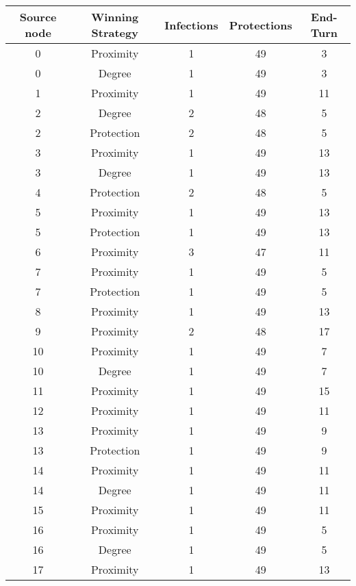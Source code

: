 \documentclass[results.tex]{subfiles}
\begin{document}
\begin{center}
  \begin{tabular}{| c || c | c | c | c |}
    \hline
    {\bfseries Source node} & {\bfseries Winning Strategy} & {\bfseries Infections} & {\bfseries Protections} & {\bfseries End-Turn} \\  %
    \hline\hline
    0 & Proximity & 1 & 49 & 3 \\ 
    \hline
    0 & Degree & 1 & 49 & 3 \\ 
    \hline
    1 & Proximity & 1 & 49 & 11 \\ 
    \hline
    2 & Degree & 2 & 48 & 5 \\ 
    \hline
    2 & Protection & 2 & 48 & 5 \\ 
    \hline
    3 & Proximity & 1 & 49 & 13 \\ 
    \hline
    3 & Degree & 1 & 49 & 13 \\ 
    \hline
    4 & Protection & 2 & 48 & 5 \\ 
    \hline
    5 & Proximity & 1 & 49 & 13 \\ 
    \hline
    5 & Protection & 1 & 49 & 13 \\ 
    \hline
    6 & Proximity & 3 & 47 & 11 \\ 
    \hline
    7 & Proximity & 1 & 49 & 5 \\ 
    \hline
    7 & Protection & 1 & 49 & 5 \\ 
    \hline
    8 & Proximity & 1 & 49 & 13 \\ 
    \hline
    9 & Proximity & 2 & 48 & 17 \\ 
    \hline
    10 & Proximity & 1 & 49 & 7 \\ 
    \hline
    10 & Degree & 1 & 49 & 7 \\ 
    \hline
    11 & Proximity & 1 & 49 & 15 \\ 
    \hline
    12 & Proximity & 1 & 49 & 11 \\ 
    \hline
    13 & Proximity & 1 & 49 & 9 \\ 
    \hline
    13 & Protection & 1 & 49 & 9 \\ 
    \hline
    14 & Proximity & 1 & 49 & 11 \\ 
    \hline
    14 & Degree & 1 & 49 & 11 \\ 
    \hline
    15 & Proximity & 1 & 49 & 11 \\ 
    \hline
    16 & Proximity & 1 & 49 & 5 \\ 
    \hline
    16 & Degree & 1 & 49 & 5 \\ 
    \hline
    17 & Proximity & 1 & 49 & 13 \\ 

\end{tabular}
\end{center}
\end{document}
